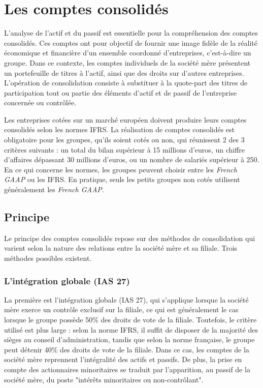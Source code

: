 \documentclass[a4paper, 12pt]{report}
\begin{document}
\section{Les comptes consolidés}

L'analyse de l'actif et du passif est essentielle pour la compréhension des comptes consolidés. Ces comptes ont pour objectif de fournir une image fidèle de la réalité économique et financière d'un ensemble coordonné d'entreprises, c'est-à-dire un groupe. Dans ce contexte, les comptes individuels de la société mère présentent un portefeuille de titres à l'actif, ainsi que des droits sur d'autres entreprises. L'opération de consolidation consiste à substituer à la quote-part des titres de participation tout ou partie des éléments d'actif et de passif de l'entreprise concernée ou contrôlée.

Les entreprises cotées sur un marché européen doivent produire leurs comptes consolidés selon les normes IFRS. La réalisation de comptes consolidés est obligatoire pour les groupes, qu'ils soient cotés ou non, qui réunissent 2 des 3 critères suivants : un total du bilan supérieur à 15 millions d'euros, un chiffre d'affaires dépassant 30 millions d'euros, ou un nombre de salariés supérieur à 250. En ce qui concerne les normes, les groupes peuvent choisir entre les \textit{French GAAP} ou les IFRS. En pratique, seuls les petits groupes non cotés utilisent généralement les \textit{French GAAP}.

\subsection{Principe}

Le principe des comptes consolidés repose sur des méthodes de consolidation qui varient selon la nature des relations entre la société mère et sa filiale. Trois méthodes possibles existent. 

\subsubsection{L'intégration globale (IAS 27)}

La première est l'intégration globale (IAS 27), qui s'applique lorsque la société mère exerce un contrôle exclusif sur la filiale, ce qui est généralement le cas lorsque le groupe possède 50\% des droits de vote de la filiale. Toutefois, le critère utilisé est plus large : selon la norme IFRS, il suffit de disposer de la majorité des sièges au conseil d'administration, tandis que selon la norme française, le groupe peut détenir 40\% des droits de vote de la filiale. Dans ce cas, les comptes de la société mère reprennent l'intégralité des actifs et passifs. De plus, la prise en compte des actionnaires minoritaires se traduit par l'apparition, au passif de la société mère, du poste "intérêts minoritaires ou non-contrôlant".
\end{document}
